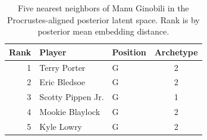 \begin{table}[htbp]
  \centering\small
  \begin{tabular}{rllc}
    \toprule
    Rank & Player & Position & Archetype \\
    \midrule
    1 & Terry Porter & G & 2 \\
    2 & Eric Bledsoe & G & 2 \\
    3 & Scotty Pippen Jr. & G & 1 \\
    4 & Mookie Blaylock & G & 2 \\
    5 & Kyle Lowry & G & 2 \\
    \bottomrule
  \end{tabular}
  \caption{Five nearest neighbors of Manu Ginobili in the Procrustes-aligned posterior latent space. Rank is by posterior mean embedding distance.}
  \label{tab:Manu_Ginobili_neighbors}
\end{table}

